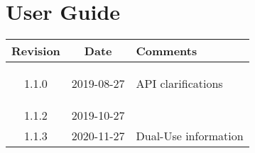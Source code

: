 \section{User Guide}
\begin{tabularx}{\textwidth}{|c|c|X|}
    \hline
    Revision & Date & Comments\\
    \hline\hline
    \hypertarget{ugrev}{1.1.0} & 2019-08-27 & API clarifications\\
	\hline
    1.1.2 & 2019-10-27 &  \\
    \hline
    1.1.3 & 2020-11-27 & Dual-Use information\\
    \hline
\end{tabularx}